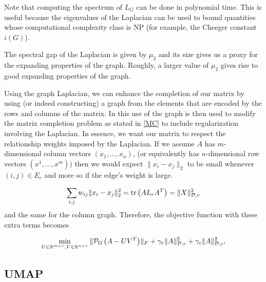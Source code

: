 \documentclass[12pt]{article}
\begin{document}
\begin{obs}
    Note that computing the spectrum of $L_G$ can be done in polynomial time. This is useful because the eigenvalues of the Laplacian can be used to bound quantities whose computational complexity class is NP (for example, the Cheeger constant $i(G)$). 
\end{obs}

\begin{remark}
    The spectral gap of the Laplacian is given by $\mu_2$ and its size gives us a proxy for the expanding properties of the graph. Roughly, a larger value of $\mu_2$ gives rise to good expanding properties of the graph.
\end{remark}

Using the graph Laplacian, we can enhance the completion of our matrix by using (or indeed constructing) a graph from the elements that are encoded by the rows and columns of the matrix. In \cite{kalofolias2014} this use of the graph is then used to modify the matrix completion problem as stated in \eqref{MC} to include regularization involving the Laplacian. In essence, we want our matrix to respect the relationship weights imposed by the Laplacian. If we assume $A$ has $m$-dimensional column vectors $(x_1,\dots, x_n)$, (or equivalently has $n$-dimensional row vectors $\left(x^1,\dots,x^m\right)$) then we would expect $\lVert x_i - x_j \rVert_2$ to be small whenever $(i,j)\in E_c$ and more so if the edge's weight is large. 

\begin{equation*}
    \sum_{i,j}{w_{ij}\lVert x_i - x_j \rVert^{2}_{2}} = \tr\left(AL_rA^T\right) = \lVert X\rVert^{2}_{\mathcal{D},r}
\end{equation*}
and the same for the column graph. Therefore, the objective function with these extra terms becomes

\begin{equation}
    \min_{U\in\mathbb{R}^{m\times r},V\in\mathbb{R}^{n\times r}}{\lVert \mathcal{P}_{\Omega}\left(A-UV^T\right)\rVert_F + \gamma_r\lVert A \rVert^{2}_{\mathcal{D},r} + \gamma_c\lVert A \rVert^{2}_{\mathcal{D},c}},
\end{equation}

\subsection{UMAP}
\end{document}
